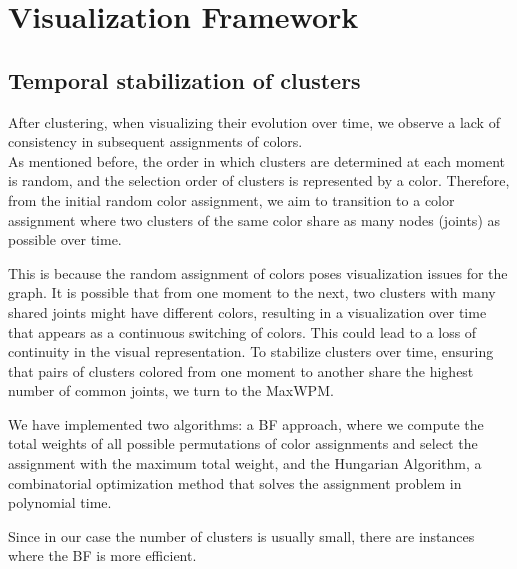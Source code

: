 \section{Visualization Framework}

\subsection{Temporal stabilization of clusters}
\label{subsec:clustering_stabilization}

After clustering, when visualizing their evolution over time, we observe a lack of consistency in subsequent assignments of colors. \\
As mentioned before, the order in which clusters are determined at each moment is random, and the selection order of clusters is represented by a color.
Therefore, from the initial random color assignment, we aim to transition to a color assignment where two clusters of the same color share as many nodes (joints) as possible over time.

This is because the random assignment of colors poses visualization issues for the graph.
It is possible that from one moment to the next, two clusters with many shared joints might have different colors, resulting in a visualization over time that appears as a continuous switching of colors. This could lead to a loss of continuity in the visual representation.
To stabilize clusters over time, ensuring that pairs of clusters colored from one moment to another share the highest number of common joints, we turn to the MaxWPM.

We have implemented two algorithms: a BF approach, where we compute the total weights of all possible permutations of color assignments and select the assignment with the maximum total weight, and the Hungarian Algorithm, a combinatorial optimization method that solves the assignment problem in polynomial time.

Since in our case the number of clusters is usually small, there are instances where the BF is more efficient.

